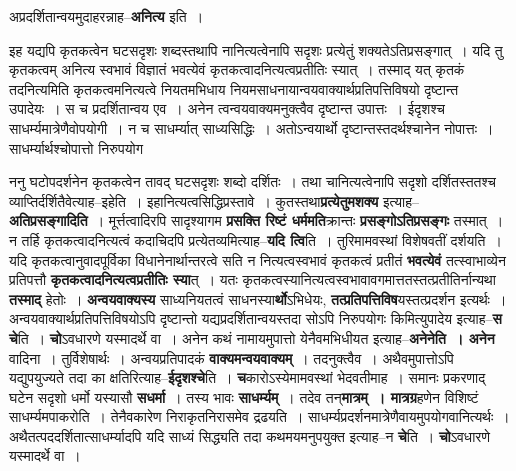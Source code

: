 \documentclass[article,12pt,a4paper]{memoir}
\begin{document}
	  \pstart अप्रदर्शितान्वयमुदाहरन्नाह--\textbf{अनित्य} इति ।
	\pend
	  \bigskip
	  \begingroup
	

	  \pstart इह यद्यपि कृतकत्वेन घटसदृशः शब्दस्तथापि नानित्यत्वेनापि सदृशः प्रत्येतुं शक्यतेऽतिप्रसङ्गात् । यदि तु कृतकत्वम् अनित्य स्वभावं विज्ञातं भवत्येवं कृतकत्वादनित्यत्वप्रतीतिः स्यात् । तस्माद् यत् कृतकं तदनित्यमिति कृतकत्वमनित्यत्वे नियतमभिधाय नियमसाधनायान्वयवाक्यार्थप्रतिपत्तिविषयो दृष्टान्त उपादेयः । स च प्रदर्शितान्वय एव । अनेन त्वन्वयवाक्यमनुक्त्वैव दृष्टान्त उपात्तः । ईदृशश्च साधर्म्यमात्रेणैवोपयोगी । न च साधर्म्यात् साध्यसिद्धिः । अतोऽन्वयार्थो दृष्टान्तस्तदर्थश्चानेन नोपात्तः । साधर्म्यार्थश्चोपात्तो निरुपयोग
	\pend
      
	  \endgroup
	

	  \pstart ननु घटोपदर्शनेन कृतकत्वेन तावद् घटसदृशः शब्दो दर्शितः । तथा चानित्यत्वेनापि सदृशो दर्शितस्ततश्च व्याप्तिर्दर्शितैवेत्याह--इहेति । इहानित्यत्वसिद्धिप्रस्तावे । कुतस्तथा\textbf{प्रत्येतुमशक्य} इत्याह--\textbf{अतिप्रसङ्गादिति} । मूर्त्तत्वादिरपि सादृश्यागम  \textbf{प्रसक्ति  रिष्टं धर्ममति}क्रान्तः \textbf{प्रसङ्गोऽतिप्रसङ्गः} तस्मात् । न तर्हि कृतकत्वादनित्यत्वं कदाचिदपि प्रत्येतव्यमित्याह--\textbf{यदि त्वि}ति । तुरिमामवस्थां विशेषवतीं दर्शयति । यदि कृतकत्वानुवादपूर्विका  विधानेनार्थान्तरत्वे सति न नित्यत्वस्वभावं कृतकत्वं प्रतीतं \textbf{भवत्येवं} तत्स्वाभाव्येन प्रतिपत्तौ \textbf{कृतकत्वादनित्यत्वप्रतीतिः स्या}त् । यतः कृतकत्वस्यानित्यत्वस्वभावावगमात्ततस्तत्प्रतीतिर्नान्यथा \textbf{तस्माद्} हेतोः । \textbf{अन्वयवाक्यस्य} साध्यनियतत्वं साधनस्या\textbf{र्थो}ऽभिधेयः, \textbf{तत्प्रतिपत्तिविष}यस्तत्प्रदर्शन इत्यर्थः । अन्वयवाक्यार्थप्रतिपत्तिविषयोऽपि दृष्टान्तो यद्यप्रदर्शितान्वयस्तदा सोऽपि निरुपयोगः किमित्युपादेय इत्याह--\textbf{स चे}ति । \textbf{चो}ऽवधारणे यस्मादर्थे वा । अनेन कथं नामायमुपात्तो येनैवमभिधीयत इत्याह--\textbf{अनेनेति । अनेन} वादिना । तुर्विशेषार्थः । अन्वयप्रतिपादकं \textbf{वाक्यमन्वयवाक्यम्} । तदनुक्त्वैव । अथैवमुपात्तोऽपि यद्युपयुज्यते तदा का क्षतिरित्याह--\textbf{ईदृशश्चे}ति । \textbf{च}कारोऽस्येमामवस्थां भेदवतीमाह । समानः प्रकरणाद् घटेन सदृशो धर्मो यस्यासौ \textbf{सधर्मा} । तस्य भावः \textbf{साधर्म्यम्} । तदेव तन्\textbf{मात्रम् । मात्रग्र}हणेन विशिष्टं साधर्म्यमपाकरोति । तेनैवकारेण निराकृतनिरासमेव द्रढयति । साधर्म्यप्रदर्शनमात्रेणैवायमुपयोगवानित्यर्थः । अथैतत्पददर्शितात्साधर्म्यादपि यदि साध्यं सिद्ध्यति तदा कथमयमनुपयुक्त इत्याह--न \textbf{चे}ति । \textbf{चो}ऽवधारणे यस्मादर्थे वा ।
	\pend
      
\end{document}
